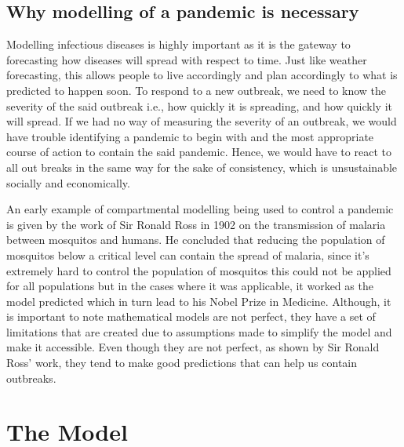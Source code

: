\documentclass[11pt]{article}
\begin{document}
\subsection{Why modelling of a pandemic is necessary}
Modelling infectious diseases is highly important as it is the gateway to forecasting how diseases will spread with respect to time. Just like weather forecasting, this allows people to live accordingly and plan accordingly to what is predicted to happen soon. To respond to a new outbreak, we need to know the severity of the said outbreak i.e., how quickly it is spreading, and how quickly it will spread. If we had no way of measuring the severity of an outbreak, we would have trouble identifying a pandemic to begin with and the most appropriate course of action to contain the said pandemic. Hence, we would have to react to all out breaks in the same way for the sake of consistency, which is unsustainable socially and economically. \par
An early example of compartmental modelling being used to control a pandemic is given by the work of Sir Ronald Ross in 1902 on the transmission of malaria between mosquitos and humans. He concluded that reducing the population of mosquitos below a critical level can contain the spread of malaria, since it’s extremely hard to control the population of mosquitos this could not be applied for all populations but in the cases where it was applicable, it worked as the model predicted which in turn lead to his Nobel Prize in Medicine\citep{brauer2019introduction}. Although, it is important to note mathematical models are not perfect, they have a set of limitations that are created due to assumptions made to simplify the model and make it accessible. Even though they are not perfect, as shown by Sir Ronald Ross’ work, they tend to make good predictions that can help us contain outbreaks.
\section{The Model}
\end{document}
